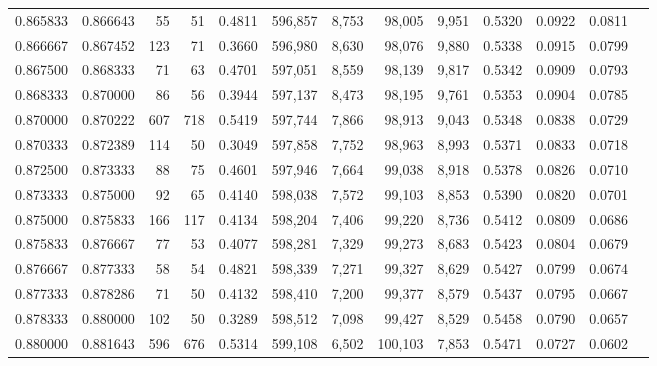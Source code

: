 \begin{tabular}{rrrrrrrrrrrrr}
0.865833 & 0.866643 &    55 &  51 &                                     0.4811 & 596,857 &   8,753 &  98,005 &   9,951 & 0.5320 & 0.0922 & 0.0811 \\
0.866667 & 0.867452 &   123 &  71 &                                     0.3660 & 596,980 &   8,630 &  98,076 &   9,880 & 0.5338 & 0.0915 & 0.0799 \\
0.867500 & 0.868333 &    71 &  63 &                                     0.4701 & 597,051 &   8,559 &  98,139 &   9,817 & 0.5342 & 0.0909 & 0.0793 \\
0.868333 & 0.870000 &    86 &  56 &                                     0.3944 & 597,137 &   8,473 &  98,195 &   9,761 & 0.5353 & 0.0904 & 0.0785 \\
0.870000 & 0.870222 &   607 & 718 &                                     0.5419 & 597,744 &   7,866 &  98,913 &   9,043 & 0.5348 & 0.0838 & 0.0729 \\
0.870333 & 0.872389 &   114 &  50 &                                     0.3049 & 597,858 &   7,752 &  98,963 &   8,993 & 0.5371 & 0.0833 & 0.0718 \\
0.872500 & 0.873333 &    88 &  75 &                                     0.4601 & 597,946 &   7,664 &  99,038 &   8,918 & 0.5378 & 0.0826 & 0.0710 \\
0.873333 & 0.875000 &    92 &  65 &                                     0.4140 & 598,038 &   7,572 &  99,103 &   8,853 & 0.5390 & 0.0820 & 0.0701 \\
0.875000 & 0.875833 &   166 & 117 &                                     0.4134 & 598,204 &   7,406 &  99,220 &   8,736 & 0.5412 & 0.0809 & 0.0686 \\
0.875833 & 0.876667 &    77 &  53 &                                     0.4077 & 598,281 &   7,329 &  99,273 &   8,683 & 0.5423 & 0.0804 & 0.0679 \\
0.876667 & 0.877333 &    58 &  54 &                                     0.4821 & 598,339 &   7,271 &  99,327 &   8,629 & 0.5427 & 0.0799 & 0.0674 \\
0.877333 & 0.878286 &    71 &  50 &                                     0.4132 & 598,410 &   7,200 &  99,377 &   8,579 & 0.5437 & 0.0795 & 0.0667 \\
0.878333 & 0.880000 &   102 &  50 &                                     0.3289 & 598,512 &   7,098 &  99,427 &   8,529 & 0.5458 & 0.0790 & 0.0657 \\
0.880000 & 0.881643 &   596 & 676 &                                     0.5314 & 599,108 &   6,502 & 100,103 &   7,853 & 0.5471 & 0.0727 & 0.0602 \\

\end{tabular}
